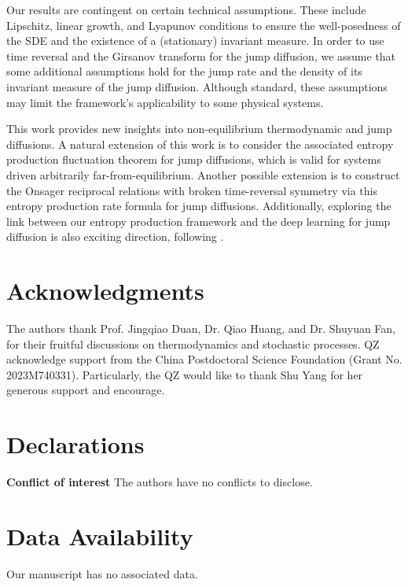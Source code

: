 \documentclass[10pt]{article}
\theoremstyle{definition}
\theoremstyle{remark}
\numberwithin{equation}{section}
\begin{document}
Our results are contingent on certain technical assumptions. These include Lipschitz, linear growth, and Lyapunov conditions to ensure the well-posedness of the SDE and the existence of a (stationary) invariant measure. In order to use time reversal and the Girsanov transform for the jump diffusion, we assume that some additional assumptions hold for the jump rate and the density of its invariant measure of the jump diffusion. Although standard, these assumptions may limit the framework's applicability to some physical systems.

This work provides new insights into non-equilibrium thermodynamic and jump diffusions. A natural extension of this work is to consider the associated entropy production fluctuation theorem \cite{MN03} for jump diffusions, which is valid for systems driven arbitrarily far-from-equilibrium. 
Another possible extension is to construct the Onsager reciprocal relations with broken time-reversal symmetry via this entropy production rate formula for jump diffusions. 
Additionally, exploring the link between our entropy production framework and the deep learning for jump diffusion is also exciting direction, following \cite{BV24}.

\section*{Acknowledgments}
The authors thank Prof. Jingqiao Duan, Dr. Qiao Huang, and Dr. Shuyuan Fan, for their fruitful discussions on thermodynamics and stochastic processes.
QZ acknowledge support from the China Postdoctoral Science Foundation (Grant No. 2023M740331).
Particularly, the QZ would like to thank Shu Yang for her generous support and encourage.


\section*{Declarations}
\textbf{Conflict of interest }\quad The authors have no conflicts to disclose.

\section*{Data Availability}
Our manuscript has no associated data.

\vspace {.5cm}
\end{document}

